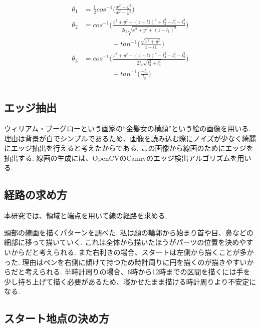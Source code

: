\documentclass[10pt]{jarticle}
\begin{document}
	\begin{equation}
		\begin{array}{c}
			\begin{split}
				\theta_1  &  =\frac{1}{2}  cos^{-1}\biggl( \frac{x^2-y^2}{x^2+y^2} \biggr) \\
				\theta_2  &  = cos^{-1}\biggl( \frac{x^2+y^2+(z-l1)^2  +  l_2^2-l_3^2-l_4^2}{2l_2\sqrt{x^2+y^2+(z-l_1)^2}} \biggr)\\
				&\qquad\qquad  +  tan^{-1}\biggl( \frac{\sqrt{x^2+y^2}}{z-l1}\biggr) \\
				\theta_3  &  =cos^{-1}\biggl( \frac{x^2+y^2+(z-l1)^2 - l_4^2-l_3^2-l_2^2}{2l_2\sqrt{l_3^2+l_4^2}}\biggr)\\
				&\qquad\qquad + tan^{-1}\biggl( \frac{-l_4}{l_3}\biggr)\\
			\end{split}
		\end{array}
	\end{equation}
	
	\normalsize

	\subsection{エッジ抽出}
	ウィリアム・ブーグローという画家の``金髪女の横顔''という絵の画像を用いる.
	理由は背景が白でシンプルであるため、画像を読み込む際にノイズが少なく綺麗にエッジ抽出を行えると考えたからである.
	この画像から線画のためにエッジを抽出する.
	線画の生成には、OpenCVのCannyのエッジ検出アルゴリズムを用いる.
	
	
	\subsection{経路の求め方}
	本研究では、領域と端点を用いて線の経路を求める.

	頭部の線画を描くパターンを調べた.
	私は顔の輪郭から始まり首や目、鼻などの細部に移って描いていく.
	これは全体から描いたほうがパーツの位置を決めやすいからだと考えられる.
	また右利きの場合、スタートは左側から描くことが多かった.
	理由はペンを右側に傾けて持つため時計周りに円を描くのが描きやすいからだと考えられる.
	半時計周りの場合、6時から12時までの区間を描くには手を少し持ち上げて描く必要があるため、寝かせたまま描ける時計周りより不安定になる.
	
	\subsection{スタート地点の決め方}
\end{document}
